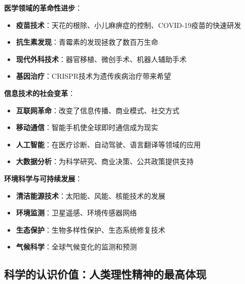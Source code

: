 \begin{examplebox}[title=科学技术改变人类生活的具体实例]
\textbf{医学领域的革命性进步}：
\begin{itemize}
\item \textbf{疫苗技术}：天花的根除、小儿麻痹症的控制、COVID-19疫苗的快速研发
\item \textbf{抗生素发现}：青霉素的发现拯救了数百万生命
\item \textbf{现代外科技术}：器官移植、微创手术、机器人辅助手术
\item \textbf{基因治疗}：CRISPR技术为遗传疾病治疗带来希望
\end{itemize}

\textbf{信息技术的社会变革}：
\begin{itemize}
\item \textbf{互联网革命}：改变了信息传播、商业模式、社交方式
\item \textbf{移动通信}：智能手机使全球即时通信成为现实
\item \textbf{人工智能}：在医疗诊断、自动驾驶、语言翻译等领域的应用
\item \textbf{大数据分析}：为科学研究、商业决策、公共政策提供支持
\end{itemize}

\textbf{环境科学与可持续发展}：
\begin{itemize}
\item \textbf{清洁能源技术}：太阳能、风能、核能技术的发展
\item \textbf{环境监测}：卫星遥感、环境传感器网络
\item \textbf{生态保护}：生物多样性保护、生态系统修复技术
\item \textbf{气候科学}：全球气候变化的监测和预测
\end{itemize}
\end{examplebox}

\subsection{科学的认识价值：人类理性精神的最高体现}

